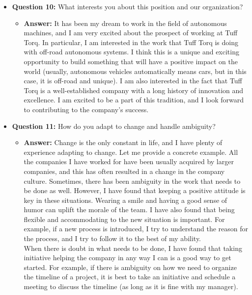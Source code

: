 \documentclass{article}
\begin{document}
\begin{itemize}
    \item \textbf{Question 10:} What interests you about this position and our organization?
    \begin{itemize}
        \item \textbf{Answer:} It has been my dream to work in the field of autonomous
        machines, and I am very excited about the prospect of working at Tuff Torq.
        In particular, I am interested in the work that Tuff Torq is doing
        with off-road autonomous systems. I think this is a unique and
        exciting opportunity to build something that will have a positive
        impact on the world (usually, autonomous vehicles automatically means
        cars, but in this case, it is off-road and unique).
        I am also interested in the fact that Tuff Torq
        is a well-established company with a long history of innovation
        and excellence. I am excited to be a part of this tradition, and
        I look forward to contributing to the company's success.
    \end{itemize}
    
    \item \textbf{Question 11:} How do you adapt to change and handle ambiguity?
    \begin{itemize}
        \item \textbf{Answer:} Change is the only constant in life, and I have
        plenty of experience adapting to change. Let me provide a concrete
        example. All the companies I have
        worked for have been usually acquired by larger companies, and
        this has often resulted in a change in the company culture. Sometimes,
        there has been ambiguity in the work that needs to be done as well.
        However, I have found that keeping a positive attitude is key in
        these situations. Wearing a smile and having a good sense of humor
        can uplift the morale of the team.
        I have also found that being flexible and 
        accommodating to the new situation is important. For example, if
        a new process is introduced, I try to understand the reason for
        the process, and I try to follow it to the best of my ability.\\
        
        When there is doubt
        in what needs to be done, I have found that taking initiative
        helping the company in any way I can is a good way to get started.
        For example, if there is ambiguity on how we need to organize
        the timeline of a project, it is best to take an initiative and
        schedule a meeting to discuss the timeline (as long as it is fine
        with my manager).
    \end{itemize}
    

\end{itemize}
\end{document}
